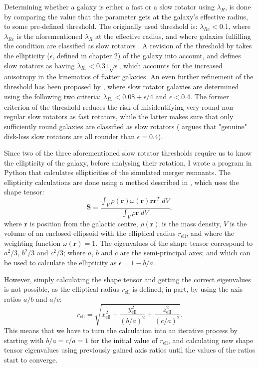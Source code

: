 \documentclass[english, oneside]{HYgradu}
\begin{document}
Determining whether a galaxy is either a fast or a slow rotator using $\lambda_R$, is done by comparing the value that the parameter gets at the galaxy's effective radius, to some pre-defined threshold. The originally used threshold is: $\lambda_{Re} < 0.1$, where $\lambda_{Re}$ is the aforementioned $\lambda_R$ at the effective radius, and where galaxies fulfilling the condition are classified as slow rotators \citep{Emsellem2007}. A revision of the threshold by \cite{Emsellem2011} takes the ellipticity ($\epsilon$, defined in chapter 2) of the galaxy into account, and defines slow rotators as having $\lambda_{R_e} < 0.31 \sqrt{\epsilon}$, which accounts for the increased anisotropy in the kinematics of flatter galaxies. An even further refinement of the threshold has been proposed by \cite{Cappellari2016}, where slow rotator galaxies are determined using the following two criteria: $\lambda_{R_e} < 0.08 + \epsilon/4$ and $\epsilon < 0.4$. The former criterion of the threshold reduces the risk of misidentifying very round non-regular slow rotators as fast rotators, while the latter makes sure that only sufficiently round galaxies are classified as slow rotators (\cite{Cappellari2016} argues that "genuine" disk-less slow rotators are all rounder than $\epsilon = 0.4$).

Since two of the three aforementioned slow rotator thresholds require us to know the ellipticity of the galaxy, before analysing their rotation, I wrote a program in Python that calculates ellipticities of the simulated merger remnants. The ellipticity calculations are done using a method described in \cite{Zemp2011}, which uses the shape tensor:
\begin{equation}
\mathbf{S} = \frac{\int_V \rho(\mathbf{r}) \omega(\mathbf{r}) \mathbf{r} \mathbf{r}^T \; dV }{\int_V \rho{\mathbf{r}} \; dV},
\end{equation}
where $\mathbf{r}$ is position from the galactic centre, $\rho(\mathbf{r})$ is the mass density, $V$ is the volume of an enclosed ellipsoid with the elliptical radius $r_\mathrm{ell}$, and where the weighting function $\omega(\mathbf{r}) = 1$. The eigenvalues of the shape tensor correspond to $a^2/3$, $b^2/3$ and $c^2/3$; where $a$, $b$ and $c$ are the semi-principal axes; and which can be used to calculate the ellipticity as $\epsilon = 1 - b/a$. 

However, simply calculating the shape tensor and getting the correct eigenvalues is not possible, as the elliptical radius $r_\mathrm{ell}$ is defined, in part, by using the axis ratios $a/b$ and $a/c$:
\begin{equation}
r_\mathrm{ell} = \sqrt{x_\mathrm{ell}^2 + \frac{y_\mathrm{ell}^2}{(b/a)^2} + \frac{z_\mathrm{ell}^2}{(c/a)^2}}.
\end{equation}
This means that we have to turn the calculation into an iterative process by starting with $b/a = c/a = 1$ for the initial value of $r_\mathrm{ell}$, and calculating new shape tensor eigenvalues using previously gained axis ratios until the values of the ratios start to converge. 
\end{document}
